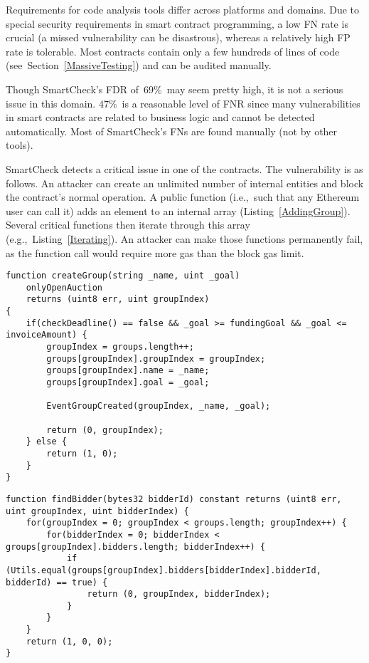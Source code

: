 Requirements for code analysis tools differ across platforms and domains.
Due to special security requirements in smart contract programming, a low FN rate is crucial (a missed vulnerability can be disastrous), whereas a relatively high FP rate is tolerable.
Most contracts contain only a few hundreds of lines of code (see~Section~\ref{MassiveTesting}) and can be audited manually.

Though SmartCheck's FDR of~$69\%$~may seem pretty high, it is not a serious issue in this domain.
$47\%$~is a reasonable level of FNR since many vulnerabilities in smart contracts are related to business logic and cannot be detected automatically.
Most of SmartCheck's FNs are found manually (not by other tools).

SmartCheck detects a critical issue in one of the contracts.
The vulnerability is as follows.
An attacker can create an unlimited number of internal entities and block the contract's normal operation.
A public function (i.e.,~such that any Ethereum user can call it) adds an element to an internal array (Listing~\ref{AddingGroup}).
Several critical functions then iterate through this array (e.g.,~Listing~\ref{Iterating}).
An attacker can make those functions permanently fail, as the function call would require more gas than the block gas limit.

\begin{minipage}{\linewidth} 
\begin{lstlisting}[caption={Adding an element to an internal array.},label={AddingGroup},language=Solidity]
function createGroup(string _name, uint _goal)
    onlyOpenAuction
    returns (uint8 err, uint groupIndex)
{
	if(checkDeadline() == false && _goal >= fundingGoal && _goal <= invoiceAmount) {
		groupIndex = groups.length++;
		groups[groupIndex].groupIndex = groupIndex;
		groups[groupIndex].name = _name;
		groups[groupIndex].goal = _goal;

		EventGroupCreated(groupIndex, _name, _goal);

		return (0, groupIndex);
	} else {
		return (1, 0);
	}
}
\end{lstlisting}
\end{minipage}

\begin{minipage}{\linewidth}
\begin{lstlisting}[caption={Iterating through an internal array.},label={Iterating},language=Solidity]
function findBidder(bytes32 bidderId) constant returns (uint8 err, uint groupIndex, uint bidderIndex) {
	for(groupIndex = 0; groupIndex < groups.length; groupIndex++) {
		for(bidderIndex = 0; bidderIndex < groups[groupIndex].bidders.length; bidderIndex++) {
			if (Utils.equal(groups[groupIndex].bidders[bidderIndex].bidderId, bidderId) == true) {
				return (0, groupIndex, bidderIndex);
			}
		}
	}
	return (1, 0, 0);
}
\end{lstlisting}
\end{minipage}

